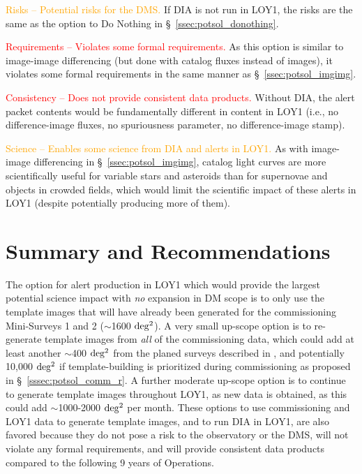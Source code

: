 \documentclass[DM,lsstdraft,toc]{lsstdoc}
\begin{document}
\textcolor{orange}{Risks -- Potential risks for the DMS.} If DIA is not run in LOY1, the risks are the same as the option to Do Nothing in \S~\ref{ssec:potsol_donothing}. 

\textcolor{red}{Requirements -- Violates some formal requirements.} As this option is similar to image-image differencing (but done with catalog fluxes instead of images), it violates some formal requirements in the same manner as \S~\ref{ssec:potsol_imgimg}. 

\textcolor{red}{Consistency -- Does not provide consistent data products.} Without DIA, the alert packet contents would be fundamentally different in content in LOY1 (i.e., no difference-image fluxes, no spuriousness parameter, no difference-image stamp).

\textcolor{orange}{Science -- Enables some science from DIA and alerts in LOY1.} As with image-image differencing in \S~\ref{ssec:potsol_imgimg}, catalog light curves are more scientifically useful for variable stars and asteroids than for supernovae and objects in crowded fields, which would limit the scientific impact of these alerts in LOY1 (despite potentially producing more of them).


\clearpage
\section{Summary and Recommendations}\label{sec:rec}

The option for alert production in LOY1 which would provide the largest potential science impact with {\em no} expansion in DM scope is to only use the template images that will have already been generated for the commissioning Mini-Surveys 1 and 2 ($\sim$1600 $\rm deg^2$). A very small up-scope option is to re-generate template images from {\em all} of the commissioning data, which could add at least another $\sim$400 $\rm deg^2$ from the planed surveys described in , and potentially 10,000 $\rm deg^2$ if template-building is prioritized during commissioning as proposed in \S~\ref{sssec:potsol_comm_r}. A further moderate up-scope option is to continue to generate template images throughout LOY1, as new data is obtained, as this could add $\sim$1000-2000 $\rm deg^2$ per month. These options to use commissioning and LOY1 data to generate template images, and to run DIA in LOY1, are also favored because they do not pose a risk to the observatory or the DMS, will not violate any formal requirements, and will provide consistent data products compared to the following 9 years of Operations. 
\end{document}
